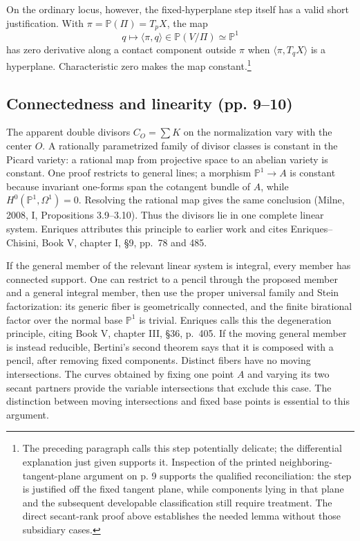 On the ordinary locus, however, the fixed-hyperplane step itself has a valid short justification. With \(\pi=\mathbb P(\Pi)=T_pX\), the map \[
q\longmapsto\langle\pi,q\rangle\in\mathbb P(V/\Pi)\simeq\mathbb P^1
\] has zero derivative along a contact component outside \(\pi\) when \(\langle\pi,T_qX\rangle\) is a hyperplane. Characteristic zero makes the map constant.\footnote{The preceding paragraph calls this step potentially delicate; the differential explanation just given supports it. Inspection of the printed neighboring-tangent-plane argument on p. 9 supports the qualified reconciliation: the step is justified off the fixed tangent plane, while components lying in that plane and the subsequent developable classification still require treatment. The direct secant-rank proof above establishes the needed lemma without those subsidiary cases.}

\subsection{Connectedness and linearity (pp. 9–10)}

The apparent double divisors \(C_O=\sum K\) on the normalization vary with the center \(O\). A rationally parametrized family of divisor classes is constant in the Picard variety: a rational map from projective space to an abelian variety is constant. One proof restricts to general lines; a morphism \(\mathbb P^1\to A\) is constant because invariant one-forms span the cotangent bundle of \(A\), while \(H^0(\mathbb P^1,\Omega^1)=0\). Resolving the rational map gives the same conclusion (Milne, 2008, I, Propositions 3.9--3.10). Thus the divisors lie in one complete linear system. Enriques attributes this principle to earlier work and cites Enriques--Chisini, Book V, chapter I, §9, pp.~78 and 485.

If the general member of the relevant linear system is integral, every member has connected support. One can restrict to a pencil through the proposed member and a general integral member, then use the proper universal family and Stein factorization: its generic fiber is geometrically connected, and the finite birational factor over the normal base \(\mathbb P^1\) is trivial. Enriques calls this the degeneration principle, citing Book V, chapter III, §36, p.~405. If the moving general member is instead reducible, Bertini's second theorem says that it is composed with a pencil, after removing fixed components. Distinct fibers have no moving intersections. The curves obtained by fixing one point \(A\) and varying its two secant partners provide the variable intersections that exclude this case. The distinction between moving intersections and fixed base points is essential to this argument.

